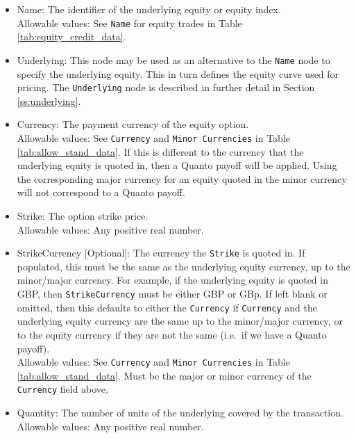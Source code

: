 \begin{itemize}
	\item Name: The identifier of the underlying equity or equity index. \\
	Allowable values: See \lstinline!Name! for equity trades in Table \ref{tab:equity_credit_data}.
	\item Underlying: This node may be used as an alternative to the \lstinline!Name! node to
	specify the underlying equity. This in turn defines the equity curve used for pricing. The
	\lstinline!Underlying! node is described in further detail in Section \ref{ss:underlying}. \\
	\item Currency: The payment currency of the equity option. \\
	Allowable values: See \lstinline!Currency! and \lstinline!Minor Currencies! in Table
	\ref{tab:allow_stand_data}.	If this is different to the currency that the underlying equity
	is quoted in, then a Quanto payoff will be applied. Using the corresponding major currency
	for an equity quoted in the minor currency will not correspond to a Quanto payoff.
	\item Strike: The option strike price.\\
	Allowable values: Any positive real number.	
	\item StrikeCurrency [Optional]: The currency the \lstinline!Strike! is quoted in. If
	populated, this must be the same as the underlying equity currency, up to the minor/major
	currency. For example, if the underlying equity is quoted in GBP, then
	\lstinline!StrikeCurrency! must be either GBP or GBp. If left blank or omitted, then this
	defaults to either the \lstinline!Currency! if \lstinline!Currency! and the underlying equity
	currency are the same up to the minor/major currency, or to the equity currency if they are
	not the same (i.e.\ if we have a Quanto payoff). \\
	Allowable values: See \lstinline!Currency! and \lstinline!Minor Currencies! in Table
	\ref{tab:allow_stand_data}.	Must be the major or minor currency of the \lstinline!Currency!
	field above.
	\item Quantity: The number of units of the underlying covered by the transaction. \\
	Allowable values: Any positive real number.
\end{itemize}